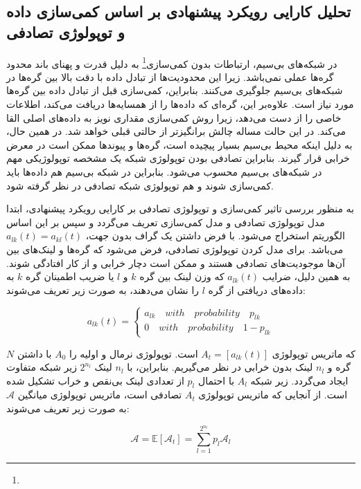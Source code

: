 \subsection{تحلیل کارایی رویکرد پیشنهادی بر اساس کمی‌سازی داده و توپولوژی تصادفی}
در شبکه‌های بی‌سیم، ارتباطات بدون کمی‌سازی\footnote{} به دلیل قدرت و پهنای باند محدود گره‌ها عملی نمی‌باشد. زیرا این محدودیت‌ها از تبادل داده با دقت بالا بین گره‌ها در شبکه‌های بی‌سیم جلوگیری می‌کنند. بنابراین، کمی‌سازی قبل از تبادل داده بین گره‌ها مورد نیاز است. علاوه‌بر این، گره‌ای که داده‌ها را از همسایه‌ها دریافت می‌کند، اطلاعات خاصی را از دست می‌دهد، زیرا روش کمی‌سازی مقداری نویز به داده‌های اصلی القا می‌کند. در این حالت مساله چالش برانگیزتر  از حالتی قبلی خواهد شد. در همین حال، به دلیل اینکه محیط بی‌سیم بسیار پیچیده است، گره‌ها و پیوندها ممکن است در معرض خرابی قرار گیرند. بنابراین تصادفی بودن توپولوژی شبکه یک مشخصه توپولوژیکی مهم در شبکه‌های بی‌سیم محسوب می‌شود. بنابراین در شبکه بی‌سیم هم داده‌ها باید کمی‌سازی شوند و هم توپولوژی شبکه تصادفی در نظر گرفته شود. 


به منظور بررسی تاثیر کمی‌سازی و توپولوژی تصادفی بر کارایی رویکرد پیشنهادی، ابتدا مدل توپولوژی تصادفی و مدل کمی‌سازی تعریف می‌گردد و سپس بر این اساس الگوریتم  استخراج می‌شود. با فرض داشتن یک گراف بدون‌ جهت،  $a_{lk}(t)=a_{kl}(t)$ می‌باشد. برای مدل کردن توپولوژی تصادفی، فرض می‌شود که گره‌ها و لینک‌های بین آن‌ها موجودیت‌های تصادفی هستند و ممکن است دچار خرابی و از کار افتادگی شوند. به همین دلیل، ضرایب  $a_{lk}(t)$ که وزن لینک بین گره $k$ و $l$ یا ضریب اطمینان گره $k$ به داده‌های دریافتی از گره $l$ را نشان می‌دهند، به صورت زیر تعریف می‌شوند:


\begin{equation}
	a_{lk}(t)=
	\begin{cases}
		a_{lk}\quad with \quad probability \quad p_{lk}\\
		0\quad with \quad probability \quad 1-p_{lk}
	\end{cases}
\end{equation}

که ماتریس توپولوژی $A_t=[a_{lk}(t)]$ است. توپولوژی نرمال و اولیه را $A_0$  با داشتن $N$ گره و $n_l$ لینک بدون خرابی در نظر می‌گیریم. بنابراین، با $n_l$ لینک $2^{n_l}$ زیر شبکه متفاوت ایجاد می‌گردد. زیر شبکه $A_l$ با احتمال $p_l$ از تعدادی لینک بی‌نقص و خراب تشکیل شده است. از آنجایی که ماتریس توپولوژی $A_t$ تصادفی است، ماتریس توپولوژی میانگین $\mathcal{A}$ به صورت زیر تعریف می‌شوند:

\begin{equation}
	\mathcal{A}=\mathbb{E}[\mathcal{A}_t]=\sum_{l=1}^{2^{n_l}}p_l \mathcal{A}_l
\end{equation}


